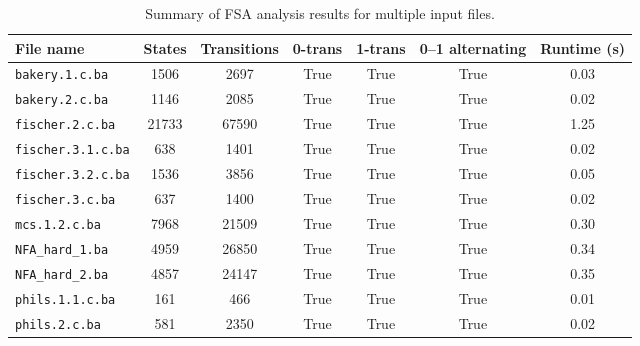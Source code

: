 \documentclass[a4paper,11pt]{article}
\begin{document}
\begin{table}[htbp]
\centering
\begin{tabular}{l|c|c|c|c|c|c}
\textbf{File name} & \textbf{States} & \textbf{Transitions} &
\textbf{0-trans} & \textbf{1-trans} &
\textbf{0–1 alternating} & \textbf{Runtime (s)} \\\hline
\texttt{bakery.1.c.ba} & 1506 & 2697 & True & True & True & 0.03 \\
\texttt{bakery.2.c.ba} & 1146 & 2085 & True & True & True & 0.02 \\
\texttt{fischer.2.c.ba} & 21733 & 67590 & True & True & True & 1.25 \\
\texttt{fischer.3.1.c.ba} & 638 & 1401 & True & True & True & 0.02 \\
\texttt{fischer.3.2.c.ba} & 1536 & 3856 & True & True & True & 0.05 \\
\texttt{fischer.3.c.ba} & 637 & 1400 & True & True & True & 0.02 \\
\texttt{mcs.1.2.c.ba} & 7968 & 21509 & True & True & True & 0.30 \\
\texttt{NFA\_hard\_1.ba} & 4959 & 26850 & True & True & True & 0.34 \\
\texttt{NFA\_hard\_2.ba} & 4857 & 24147 & True & True & True & 0.35 \\
\texttt{phils.1.1.c.ba} & 161 & 466 & True & True & True & 0.01 \\
\texttt{phils.2.c.ba} & 581 & 2350 & True & True & True & 0.02 \\
\end{tabular}
\caption{Summary of FSA analysis results for multiple input files.}
\end{table}
\end{document}
